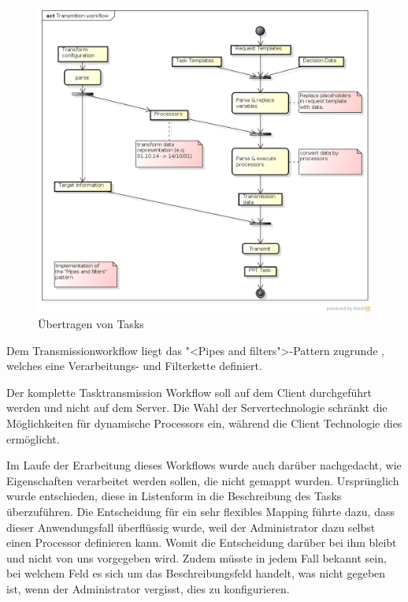 			\begin{figure}[H]
				\includegraphics[width=\textwidth]{architecture/media/img/transmissionWorkflow.png}
				\centering
				\caption{Übertragen von Tasks}
				\label{fig:transmissionWorkflow}
			\end{figure}
			Dem Transmissionworkflow liegt das "<Pipes and filters">-Pattern zugrunde
			 \cite{hope_enterprise_2003}, welches eine Verarbeitungs- und Filterkette definiert.
			
			Der komplette Tasktransmission Workflow soll auf dem Client durchgeführt werden und nicht auf dem Server. 
			Die Wahl der Servertechnologie schränkt die Möglichkeiten für dynamische Processors ein, während die Client Technologie dies ermöglicht.
			
			Im Laufe der Erarbeitung dieses Workflows wurde auch darüber nachgedacht, 
			wie Eigenschaften verarbeitet werden sollen, die nicht gemappt wurden. 
			Ursprünglich wurde entschieden, diese in Listenform in die Beschreibung des Tasks
			überzuführen. 
			Die Entscheidung für ein sehr flexibles Mapping führte dazu, 
			dass dieser Anwendungsfall überflüssig wurde, 
			weil der Administrator dazu selbst einen Processor definieren kann.
			Womit die Entscheidung darüber bei ihm bleibt und nicht von uns vorgegeben wird.
			Zudem müsste in jedem Fall bekannt sein, 
			bei welchem Feld es sich um das Beschreibungsfeld handelt, 
			was nicht gegeben ist, wenn der Administrator vergisst, dies zu konfigurieren.
			
